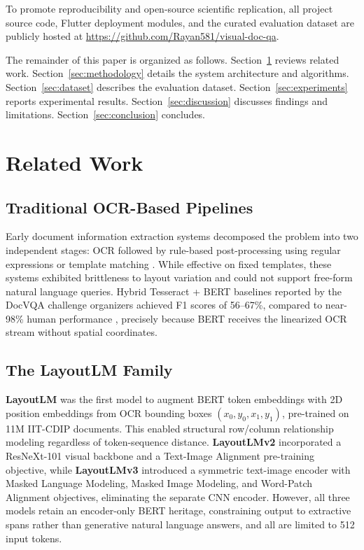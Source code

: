 \documentclass[conference]{IEEEtran}
\begin{document}
To promote reproducibility and open-source scientific replication, all project source code, Flutter deployment modules, and the curated evaluation dataset are publicly hosted at \url{https://github.com/Rayan581/visual-doc-qa}.

The remainder of this paper is organized as follows.
Section~\ref{sec:related} reviews related work.
Section~\ref{sec:methodology} details the system architecture and algorithms.
Section~\ref{sec:dataset} describes the evaluation dataset.
Section~\ref{sec:experiments} reports experimental results.
Section~\ref{sec:discussion} discusses findings and limitations.
Section~\ref{sec:conclusion} concludes.

\section{Related Work}
\label{sec:related}

\subsection{Traditional OCR-Based Pipelines}

Early document information extraction systems decomposed the problem into two
independent stages: OCR followed by rule-based post-processing using regular
expressions or template matching \cite{b_smith2007}. While effective on fixed
templates, these systems exhibited brittleness to layout variation and could
not support free-form natural language queries. Hybrid Tesseract + BERT
baselines reported by the DocVQA challenge organizers achieved F1 scores of
56--67\%, compared to near-98\% human performance \cite{b_mathew2021}, precisely
because BERT receives the linearized OCR stream without spatial coordinates.

\subsection{The LayoutLM Family}

\textbf{LayoutLM} \cite{b_xu2020} was the first model to augment BERT token
embeddings with 2D position embeddings from OCR bounding boxes
$(x_0, y_0, x_1, y_1)$, pre-trained on 11M IIT-CDIP documents. This enabled
structural row/column relationship modeling regardless of token-sequence
distance. \textbf{LayoutLMv2} \cite{b_xu2021} incorporated a ResNeXt-101
visual backbone and a Text-Image Alignment pre-training objective, while
\textbf{LayoutLMv3} \cite{b_huang2022} introduced a symmetric text-image
encoder with Masked Language Modeling, Masked Image Modeling, and Word-Patch
Alignment objectives, eliminating the separate CNN encoder. However, all three
models retain an encoder-only BERT heritage, constraining output to extractive
spans rather than generative natural language answers, and all are limited to
512 input tokens.
\end{document}
